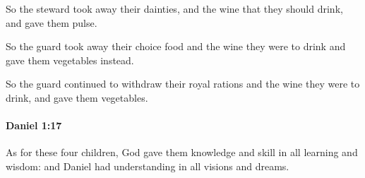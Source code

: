 			\begin{versebox}
					\item[BHS] 
					\item[LXX] 
					\item[ASV] So the steward took away their dainties, and the wine that they should drink, and gave them pulse.
					\item[NIV] So the guard took away their choice food and the wine they were to drink and gave them vegetables instead.
					\item[NRSV] So the guard continued to withdraw their royal rations and the wine they were to drink, and gave them vegetables.
			\end{versebox}

		\paragraph{Daniel 1:17} %
			\label{DANIEL-1-17}

			As for these four children, God gave them knowledge and skill in all learning and wisdom: and Daniel had understanding in all visions and dreams.

